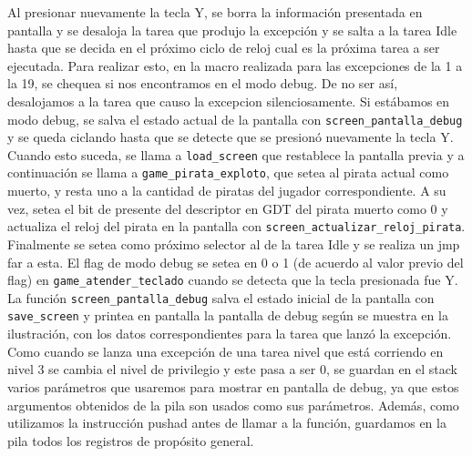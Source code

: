 Al presionar nuevamente la tecla Y, se borra la información presentada en pantalla y se desaloja la tarea que produjo la excepción y se salta a la tarea Idle hasta que se decida en el próximo ciclo de reloj cual es la próxima tarea a ser ejecutada.
Para realizar esto, en la macro realizada para las excepciones de la 1 a la 19, se chequea si nos encontramos en el modo debug. De no ser así, desalojamos a la tarea que causo la excepcion silenciosamente. Si estábamos en modo debug, se salva el estado actual de la pantalla con \texttt{screen\_pantalla\_debug} y se queda ciclando hasta que se detecte que se presionó nuevamente la tecla Y. Cuando esto suceda, se llama a \texttt{load\_screen} que restablece la pantalla previa y a continuación se llama a \texttt{game\_pirata\_exploto}, que setea al pirata actual como muerto, y resta uno a la cantidad de piratas del jugador correspondiente. A su vez, setea el bit de presente del descriptor en GDT del pirata muerto como 0 y actualiza el reloj del pirata en la pantalla con \texttt{screen\_actualizar\_reloj\_pirata}. 
Finalmente se setea como próximo selector al de la tarea Idle y se realiza un jmp far a esta.
El flag de modo debug se setea en 0 o 1 (de acuerdo al valor previo del flag) en \texttt{game\_atender\_teclado} cuando se detecta que la tecla presionada fue Y.
La función \texttt{screen\_pantalla\_debug} salva el estado inicial de la pantalla con \texttt{save\_screen} y printea en pantalla la pantalla de debug según se muestra en la ilustración, con los datos correspondientes para la tarea que lanzó la excepción.
Como cuando se lanza una excepción de una tarea nivel que está corriendo en nivel 3 se cambia el nivel de privilegio y este pasa a ser 0, se guardan en el stack varios parámetros que usaremos para mostrar en pantalla de debug, ya que estos argumentos obtenidos de la pila son usados como sus parámetros. Además, como utilizamos la instrucción pushad antes de llamar a la función, guardamos en la pila todos los registros de propósito general. 


